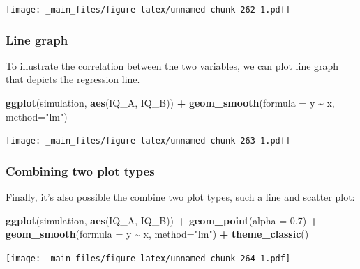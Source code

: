 \documentclass[
]{scrartcl}
\newenvironment{Shaded}{\begin{snugshade}}{\end{snugshade}}
\newcommand{\AttributeTok}[1]{\textcolor[rgb]{0.13,0.29,0.53}{#1}}
\newcommand{\FloatTok}[1]{\textcolor[rgb]{0.00,0.00,0.81}{#1}}
\newcommand{\FunctionTok}[1]{\textcolor[rgb]{0.13,0.29,0.53}{\textbf{#1}}}
\newcommand{\NormalTok}[1]{#1}
\newcommand{\SpecialCharTok}[1]{\textcolor[rgb]{0.81,0.36,0.00}{\textbf{#1}}}
\newcommand{\StringTok}[1]{\textcolor[rgb]{0.31,0.60,0.02}{#1}}
\begin{document}
\texttt{[image: \_main\_files/figure-latex/unnamed-chunk-262-1.pdf]}

\hypertarget{line-graph}{%
\subsubsection{Line graph}\label{line-graph}}

To illustrate the correlation between the two variables, we can plot line graph that depicts the regression line.

\begin{Shaded}
\begin{Highlighting}[]
\FunctionTok{ggplot}\NormalTok{(simulation, }\FunctionTok{aes}\NormalTok{(IQ\_A, IQ\_B)) }\SpecialCharTok{+}
  \FunctionTok{geom\_smooth}\NormalTok{(}\AttributeTok{formula =}\NormalTok{ y }\SpecialCharTok{\textasciitilde{}}\NormalTok{ x, }\AttributeTok{method=}\StringTok{"lm"}\NormalTok{)}
\end{Highlighting}
\end{Shaded}

\texttt{[image: \_main\_files/figure-latex/unnamed-chunk-263-1.pdf]}

\hypertarget{combining-two-plot-types}{%
\subsubsection{Combining two plot types}\label{combining-two-plot-types}}

Finally, it's also possible the combine two plot types, such a line and scatter plot:

\begin{Shaded}
\begin{Highlighting}[]
\FunctionTok{ggplot}\NormalTok{(simulation, }\FunctionTok{aes}\NormalTok{(IQ\_A, IQ\_B)) }\SpecialCharTok{+}
  \FunctionTok{geom\_point}\NormalTok{(}\AttributeTok{alpha =} \FloatTok{0.7}\NormalTok{) }\SpecialCharTok{+}
  \FunctionTok{geom\_smooth}\NormalTok{(}\AttributeTok{formula =}\NormalTok{ y }\SpecialCharTok{\textasciitilde{}}\NormalTok{ x, }\AttributeTok{method=}\StringTok{"lm"}\NormalTok{) }\SpecialCharTok{+}
  \FunctionTok{theme\_classic}\NormalTok{()}
\end{Highlighting}
\end{Shaded}

\texttt{[image: \_main\_files/figure-latex/unnamed-chunk-264-1.pdf]}

\newpage

\hypertarget{appendix-appendix}{%
\appendix}
\end{document}
